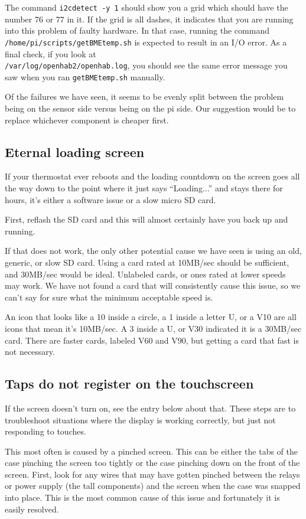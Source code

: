 The command \texttt{i2cdetect -y 1} should show you a grid which should have
the number 76 or 77 in it. If the grid is all dashes, it indicates that you are
running into this problem of faulty hardware. In that case, running the command
\texttt{/home/pi/scripts/getBMEtemp.sh} is expected to result in an I/O error.
As a final check, if you look at\\
\texttt{/var/log/openhab2/openhab.log}, you should see the same error message
you saw when you ran \texttt{getBMEtemp.sh} manually.

Of the failures we have seen, it seems to be evenly split between the problem
being on the sensor side versus being on the pi side. Our suggestion would be
to replace whichever component is cheaper first.

\subsection{Eternal loading screen}
If your thermostat ever reboots and the loading countdown on the screen goes
all the way down to the point where it just says ``Loading...'' and stays there
for hours, it's either a software issue or a slow micro SD card.

First, reflash the SD card and this will almost certainly have you back up and
running.

If that does not work, the only other potential cause we have seen is using an
old, generic, or slow SD card. Using a card rated at 10MB/sec should be
sufficient, and 30MB/sec would be ideal. Unlabeled cards, or ones rated at
lower speeds may work. We have not found a card that will consistently cause
this issue, so we can't say for sure what the minimum acceptable speed is.

An icon that looks like a 10 inside a circle, a 1 inside a letter U, or a V10
are all icons that mean it's 10MB/sec. A 3 inside a U, or V30 indicated it is
a 30MB/sec card. There are faster cards, labeled V60 and V90, but getting a
card that fast is not necessary.

\subsection{Taps do not register on the touchscreen}
If the screen doesn't turn on, see the entry below about that. These steps are
to troubleshoot situations where the display is working correctly, but just not
responding to touches.

This most often is caused by a pinched screen. This can be either the tabs of
the case pinching the screen too tightly or the case pinching down on the front
of the screen. First, look for any wires that may have gotten pinched between
the relays or power supply (the tall components) and the screen when the case
was snapped into place. This is the most common cause of this issue and
fortunately it is easily resolved.

